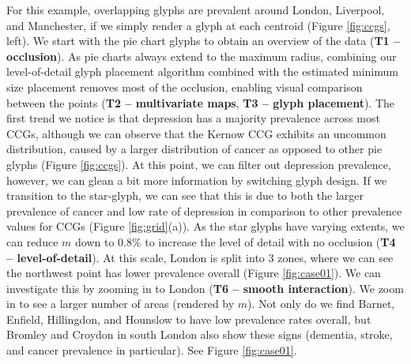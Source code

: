 For this example, overlapping glyphs are prevalent around London, Liverpool, and Manchester, if we simply render a glyph at each centroid (Figure \ref{fig:ccgs}, left). We start with the pie chart glyphs to obtain an overview of the data (\textbf{T1 -- occlusion}). As pie charts always extend to the maximum radius, combining our level-of-detail glyph placement algorithm combined with the estimated minimum size placement removes most of the occlusion, enabling visual comparison between the points (\textbf{T2 -- multivariate maps}, \textbf{T3 -- glyph placement}). The first trend we notice is that depression has a majority prevalence across most CCGs, although we can observe that the Kernow CCG  exhibits an uncommon distribution, caused by a larger distribution of cancer as opposed to other pie glyphs (Figure \ref{fig:ccgs}). At this point, we can filter out depression prevalence, however, we can glean a bit more information by switching glyph design. If we transition to the star-glyph, we can see that this is due to both the larger prevalence of cancer and low rate of depression in comparison to other prevalence values for CCGs (Figure \ref{fig:grid}(a)).
As the star glyphs have varying extents, we can reduce $m$ down to 0.8\% to increase the level of detail with no occlusion (\textbf{T4 -- level-of-detail}). At this scale, London is split into 3 zones, where we can see the northwest point has lower prevalence overall (Figure \ref{fig:case01}). We can investigate this by zooming in to London (\textbf{T6 -- smooth interaction}). We zoom in to see a larger number of areas (rendered by $m$). Not only do we find Barnet, Enfield, Hillingdon, and Hounslow to have low prevalence rates overall, but Bromley and Croydon in south London also show these signs (dementia, stroke, and cancer prevalence in particular). See Figure \ref{fig:case01}.


